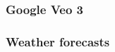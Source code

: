 %     
%
%
\begin{frame}
    \frametitle{Google Veo 3}
    
    \begin{figure}
       \centering
    \end{figure}

\end{frame}

\begin{frame}
    \frametitle{Weather forecasts}
    
    \begin{figure}
       \centering
    \end{figure}

\end{frame}



